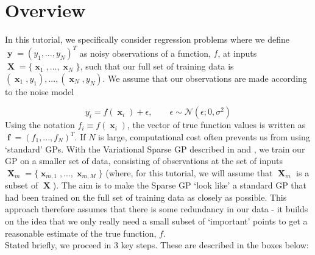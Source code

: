\documentclass[a4paper, 11pt]{article}
\DeclareMathOperator{\x}{\boldsymbol{x}}
\DeclareMathOperator{\X}{\boldsymbol{X}}
\DeclareMathOperator{\y}{\boldsymbol{y}}
\DeclareMathOperator{\f}{\boldsymbol{f}}
\begin{document}
\section{Overview}\label{sec:overview}
In this tutorial, we specifically consider regression problems where we define $\y = (y_1,...,y_N)^T$ as noisy observations of a function, $f$, at inputs $\X = \{\x_1,...,\x_N\}$, such that our full set of training data is $(\x_1,y_1),...,(\x_N,y_N)$. We assume that our observations are made according to the noise model

\begin{equation}
	y_i = f(\x_i) + \epsilon, \qquad \epsilon \sim \mathcal{N}(\epsilon;0,\sigma^2)	
\end{equation}
Using the notation $f_i \equiv f(\x_i)$, the vector of true function values is written as $\f = (f_1,...,f_N)^T$. If $N$ is large, computational cost often prevents us from using `standard' GPs. With the Variational Sparse GP described in \cite{Titsias2009} and \cite{Titsias2009a}, we train our GP on a smaller set of data, consisting of observations at the set of inputs $\X_m = \{ \x_{m,1},...,\x_{m,M} \}$ (where, for this tutorial, we will assume that $\X_m$ is a subset of $\X$). The aim is to make the Sparse GP `look like' a standard GP that had been trained on the full set of training data as closely as possible. This approach therefore assumes that there is some redundancy in our data - it builds on the idea that we only really need a small subset of `important' points to get a reasonable estimate of the true function, $f$.\\

Stated briefly, we proceed in 3 key steps. These are described in the boxes below: 
\end{document}
